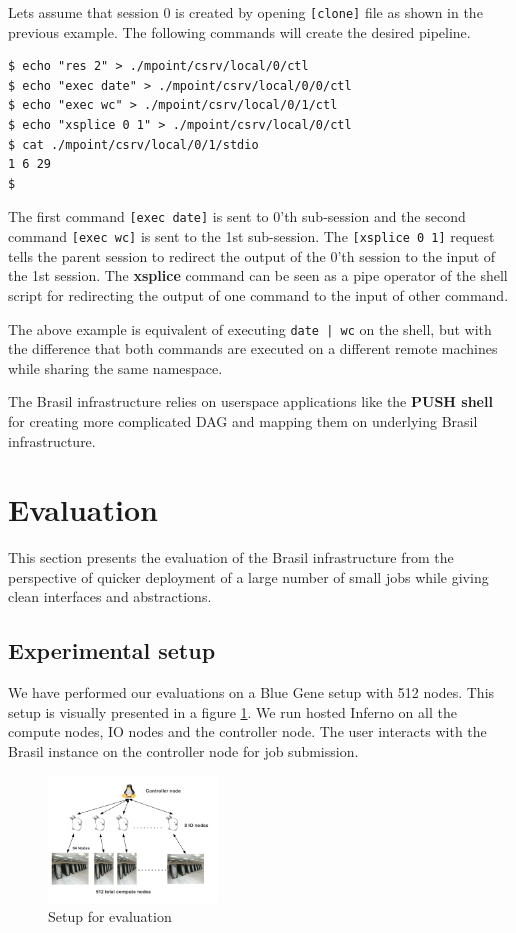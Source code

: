 \documentclass[conference]{sig-alternate}
\begin{document}
Lets assume that session 0 is created by opening \texttt{[clone]} file as shown
in the previous example.  The following commands will create the desired
pipeline.

\begin{verbatim}
$ echo "res 2" > ./mpoint/csrv/local/0/ctl
$ echo "exec date" > ./mpoint/csrv/local/0/0/ctl
$ echo "exec wc" > ./mpoint/csrv/local/0/1/ctl
$ echo "xsplice 0 1" > ./mpoint/csrv/local/0/ctl
$ cat ./mpoint/csrv/local/0/1/stdio
1 6 29
$
\end{verbatim}

The first command \texttt{[exec date]} is sent to 0'th sub-session and the
second command \texttt{[exec wc]} is sent to the 1st sub-session.  The
\texttt{[xsplice 0 1]} request tells the parent session to redirect the output
of the 0'th session to the input of the 1st session.  The \textbf{xsplice}
command can be seen as a pipe operator of the shell script for redirecting the
output of one command to the input of other command.

The above example is equivalent of executing \texttt{date | wc} on the shell,
but with the difference that both commands are executed on a different remote
machines while sharing the same namespace.

The Brasil infrastructure relies on userspace applications like the \textbf{PUSH
shell}\cite{PODC:Push} for creating more complicated DAG and mapping them on
underlying Brasil infrastructure.

\section{Evaluation}

This section presents the evaluation of the Brasil infrastructure from the
perspective of quicker deployment of a large number of small jobs while giving
clean interfaces and abstractions.


\subsection{Experimental setup}
We have performed our evaluations on a Blue Gene setup with 512 nodes.  This
setup is visually presented in a figure \ref{fig:hare}.  We run hosted Inferno
on all the compute nodes, IO nodes and the controller node.  The user interacts 
with the Brasil instance on the controller node for job submission.


\begin{figure}[h]
  \begin{center}
    \leavevmode
      \includegraphics[height=0.2\textheight,width=0.4\textwidth]
		{./img/EvaluationSetup}
    \caption{Setup for evaluation}
    \label{fig:hare}
  \end{center}
\end{figure}
\end{document}
